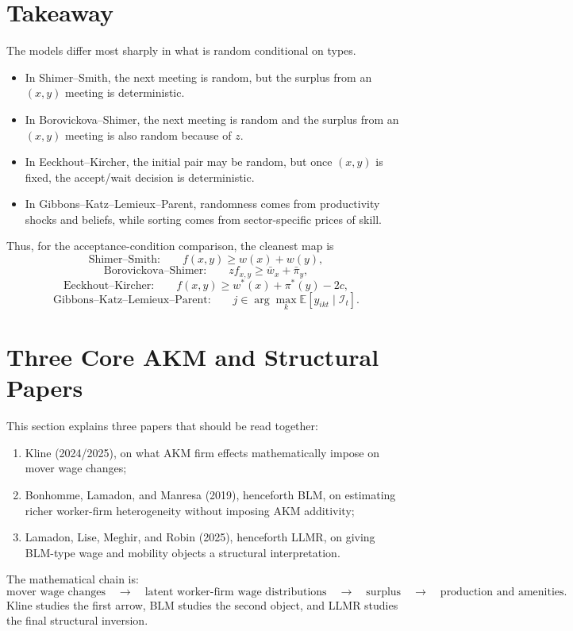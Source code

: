 \documentclass[11pt]{article}
\newcommand{\E}{\mathbb{E}}
\newcommand{\1}{\mathbf{1}}
\begin{document}
\section{Takeaway}

The models differ most sharply in what is random conditional on types.

\begin{itemize}
    \item In Shimer--Smith, the next meeting is random, but the surplus from an $(x,y)$ meeting is deterministic.
    \item In Borovickova--Shimer, the next meeting is random and the surplus from an $(x,y)$ meeting is also random because of $z$.
    \item In Eeckhout--Kircher, the initial pair may be random, but once $(x,y)$ is fixed, the accept/wait decision is deterministic.
    \item In Gibbons--Katz--Lemieux--Parent, randomness comes from productivity shocks and beliefs, while sorting comes from sector-specific prices of skill.
\end{itemize}

Thus, for the acceptance-condition comparison, the cleanest map is
\[
\text{Shimer--Smith:}
\qquad
f(x,y)\geq w(x)+w(y),
\]
\[
\text{Borovickova--Shimer:}
\qquad
z f_{x,y}\geq \bar w_x+\bar \pi_y,
\]
\[
\text{Eeckhout--Kircher:}
\qquad
f(x,y)\geq w^*(x)+\pi^*(y)-2c,
\]
\[
\text{Gibbons--Katz--Lemieux--Parent:}
\qquad
j\in\arg\max_k \E[y_{ikt}\mid \mathcal I_t].
\]

\section{Three Core AKM and Structural Papers}

This section explains three papers that should be read together:
\begin{enumerate}
    \item Kline (2024/2025), on what AKM firm effects mathematically impose on mover wage changes;
    \item Bonhomme, Lamadon, and Manresa (2019), henceforth BLM, on estimating richer worker-firm heterogeneity without imposing AKM additivity;
    \item Lamadon, Lise, Meghir, and Robin (2025), henceforth LLMR, on giving BLM-type wage and mobility objects a structural interpretation.
\end{enumerate}

The mathematical chain is:
\[
\boxed{
\text{mover wage changes}
\quad\to\quad
\text{latent worker-firm wage distributions}
\quad\to\quad
\text{surplus}
\quad\to\quad
\text{production and amenities}.
}
\]
Kline studies the first arrow, BLM studies the second object, and LLMR studies the final structural inversion.
\end{document}
